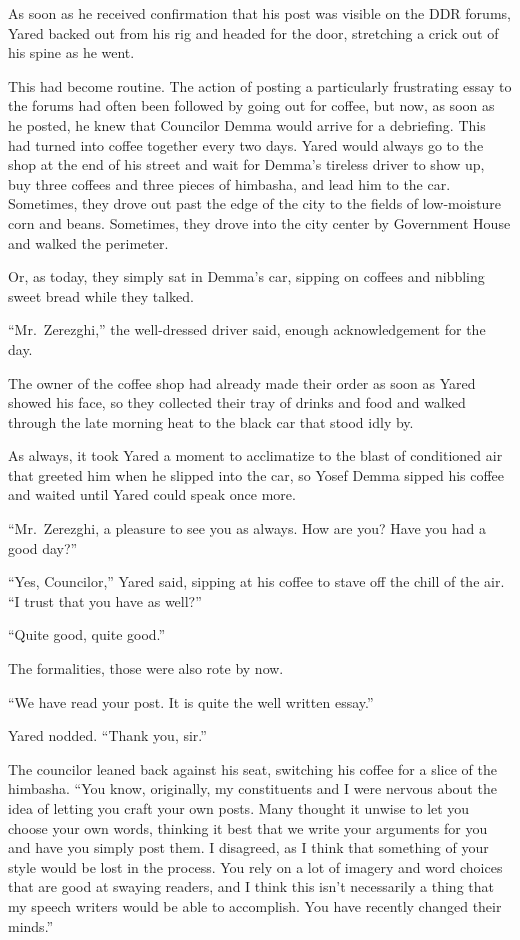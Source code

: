 As soon as he received confirmation that his post was visible on the DDR forums, Yared backed out from his rig and headed for the door, stretching a crick out of his spine as he went.

This had become routine. The action of posting a particularly frustrating essay to the forums had often been followed by going out for coffee, but now, as soon as he posted, he knew that Councilor Demma would arrive for a debriefing. This had turned into coffee together every two days. Yared would always go to the shop at the end of his street and wait for Demma's tireless driver to show up, buy three coffees and three pieces of himbasha, and lead him to the car. Sometimes, they drove out past the edge of the city to the fields of low-moisture corn and beans. Sometimes, they drove into the city center by Government House and walked the perimeter.

Or, as today, they simply sat in Demma's car, sipping on coffees and nibbling sweet bread while they talked.

``Mr.~Zerezghi,'' the well-dressed driver said, enough acknowledgement for the day.

The owner of the coffee shop had already made their order as soon as Yared showed his face, so they collected their tray of drinks and food and walked through the late morning heat to the black car that stood idly by.

As always, it took Yared a moment to acclimatize to the blast of conditioned air that greeted him when he slipped into the car, so Yosef Demma sipped his coffee and waited until Yared could speak once more.

``Mr.~Zerezghi, a pleasure to see you as always. How are you? Have you had a good day?''

``Yes, Councilor,'' Yared said, sipping at his coffee to stave off the chill of the air. ``I trust that you have as well?''

``Quite good, quite good.''

The formalities, those were also rote by now.

``We have read your post. It is quite the well written essay.''

Yared nodded. ``Thank you, sir.''

The councilor leaned back against his seat, switching his coffee for a slice of the himbasha. ``You know, originally, my constituents and I were nervous about the idea of letting you craft your own posts. Many thought it unwise to let you choose your own words, thinking it best that we write your arguments for you and have you simply post them. I disagreed, as I think that something of your style would be lost in the process. You rely on a lot of imagery and word choices that are good at swaying readers, and I think this isn't necessarily a thing that my speech writers would be able to accomplish. You have recently changed their minds.''

